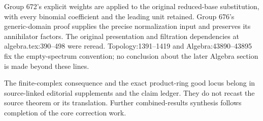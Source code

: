 Group 672's explicit weights are applied to the original reduced-base substitution, with every binomial coefficient and the leading unit retained. Group 676's generic-domain proof supplies the precise normalization input and preserves its annihilator factors. The original presentation and filtration dependencies at algebra.tex:390--498 were reread. Topology:1391--1419 and Algebra:43890--43895 fix the empty-spectrum convention; no conclusion about the later Algebra section is made beyond these lines.

The finite-complex consequence and the exact product-ring good locus belong in source-linked editorial supplements and the claim ledger. They do not recast the source theorem or its translation. Further combined-results synthesis follows completion of the core correction work.
